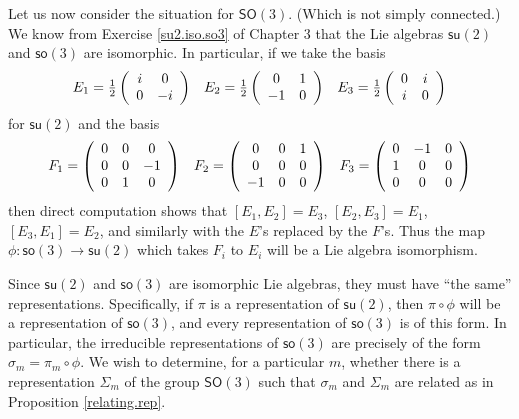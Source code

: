\documentclass[12pt]{amsbook}
\theoremstyle{plain}
\numberwithin{equation}{chapter}
\numberwithin{theorem}{chapter}
\begin{document}
Let us now consider the situation for $\mathsf{SO}(3)$. (Which is not simply
connected.) We know from Exercise \ref{su2.iso.so3} of Chapter 3 that the Lie
algebras $\mathsf{su}(2)$ and $\mathsf{so}(3)$ are isomorphic. In particular,
if we take the basis
\[%
\begin{array}
[c]{ccc}%
E_{1}=\tfrac12\left(
\begin{array}
[c]{cc}%
i & 0\\
0 & -i
\end{array}
\right)  & E_{2}=\tfrac12\left(
\begin{array}
[c]{cc}%
0 & 1\\
-1 & 0
\end{array}
\right)  & E_{3}=\tfrac12\left(
\begin{array}
[c]{cc}%
0 & i\\
i & 0
\end{array}
\right)
\end{array}
\]
for $\mathsf{su}(2)$ and the basis
\[%
\begin{array}
[c]{ccc}%
F_{1}=\left(
\begin{array}
[c]{ccc}%
0 & 0 & 0\\
0 & 0 & -1\\
0 & 1 & 0
\end{array}
\right)  & F_{2}=\left(
\begin{array}
[c]{ccc}%
0 & 0 & 1\\
0 & 0 & 0\\
-1 & 0 & 0
\end{array}
\right)  & F_{3}=\left(
\begin{array}
[c]{ccc}%
0 & -1 & 0\\
1 & 0 & 0\\
0 & 0 & 0
\end{array}
\right)
\end{array}
\]
then direct computation shows that $\left[  E_{1},E_{2}\right]  =E_{3}$,
$\left[  E_{2},E_{3}\right]  =E_{1}$, $\left[  E_{3},E_{1}\right]  =E_{2}$,
and similarly with the $E $'s replaced by the $F$'s. Thus the map
$\phi:\mathsf{so}(3)\rightarrow\mathsf{su}(2)$ which takes $F_{i}$ to $E_{i}$
will be a Lie algebra isomorphism.

Since $\mathsf{su}(2)$ and $\mathsf{so}(3)$ are isomorphic Lie algebras, they
must have ``the same'' representations. Specifically, if $\pi$ is a
representation of $\mathsf{su}(2)$, then $\pi\circ\phi$ will be a
representation of $\mathsf{so}(3)$, and every representation of $\mathsf{so}%
(3)$ is of this form. In particular, the irreducible representations of
$\mathsf{so}(3)$ are precisely of the form $\sigma_{m}=\pi_{m}\circ\phi$. We
wish to determine, for a particular $m$, whether there is a representation
$\Sigma_{m} $ of the group $\mathsf{SO}(3)$ such that $\sigma_{m}$ and
$\Sigma_{m}$ are related as in Proposition \ref{relating.rep}.
\end{document}

